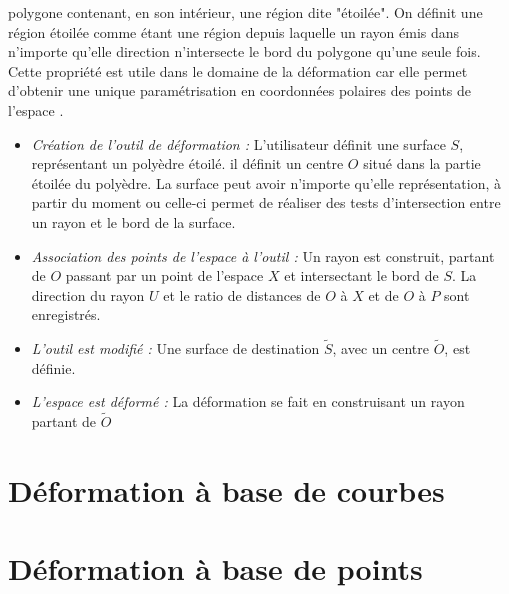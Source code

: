 \begin{itemize}
  polygone contenant, en son intérieur, une région dite "étoilée". On
  définit une région étoilée comme étant une région depuis laquelle un
  rayon émis dans n'importe qu'elle direction n'intersecte le bord du
  polygone qu'une seule fois. Cette propriété est utile dans le
  domaine de la déformation car elle permet d'obtenir une unique
  paramétrisation en coordonnées polaires des points de l'espace
  \cite{JL00}.
  \begin{itemize}
  \item{\textit{Création de l'outil de déformation :}} L'utilisateur
    définit une surface \( S \), représentant un polyèdre étoilé. il
    définit un centre \( O \) situé dans la partie étoilée du
    polyèdre. La surface peut avoir n'importe qu'elle représentation,
    à partir du moment ou celle-ci permet de réaliser des tests
    d'intersection entre un rayon et le bord de la surface.
  \item{\textit{Association des points de l'espace à l'outil :}} Un
    rayon est construit, partant de \( O \) passant par un point de
    l'espace \( X \) et intersectant le bord de \( S \). La direction
    du rayon \( U \) et le ratio de distances de \( O \) à \( X \) et
    de \( O \) à \( P \) sont enregistrés.
  \item{\textit{L'outil est modifié :}} Une surface de destination \(
    \tilde{S} \), avec un centre \( \tilde{O} \), est définie.
  \item{\textit{L'espace est déformé :}} La déformation se fait en
    construisant un rayon partant de \( \tilde{O} \)
  \end{itemize}
\end{itemize}

\section{Déformation à base de courbes}

\section{Déformation à base de points}


